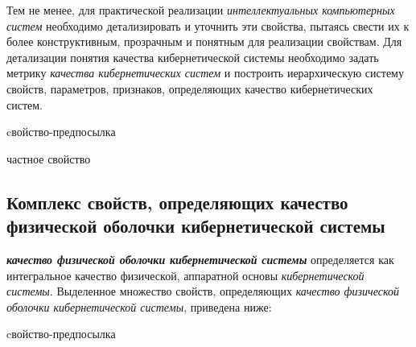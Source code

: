 Тем не менее, для практической реализации \textit{интеллектуальных компьютерных систем} необходимо детализировать и уточнить эти свойства, пытаясь свести их к более конструктивным, прозрачным и понятным для реализации свойствам. Для детализации понятия качества кибернетической системы необходимо задать метрику \textit{качества кибернетических систем} и построить иерархическую систему свойств, параметров, признаков, определяющих качество кибернетических систем.

\begin{SCn}
\begin{scnrelfromlist}{cвойство-предпосылка}
    \begin{scnindent}
        \begin{scnrelfromset}{частное свойство}
        \end{scnrelfromset}
    \end{scnindent}
\end{scnrelfromlist}
\end{SCn}


\subsection{Комплекс свойств, определяющих качество физической оболочки кибернетической системы}
{\label{sec_cyb_syst_physical_shell_quality}} 

\textbf{\textit{качество физической оболочки кибернетической системы}} определяется как интегральное качество физической, аппаратной основы \textit{кибернетической системы}. Выделенное множество свойств, определяющих \textit{качество физической оболочки кибернетической системы}, приведена ниже:
 
\begin{SCn}
\begin{scnrelfromlist}{cвойство-предпосылка}
\end{scnrelfromlist}
\end{SCn}

